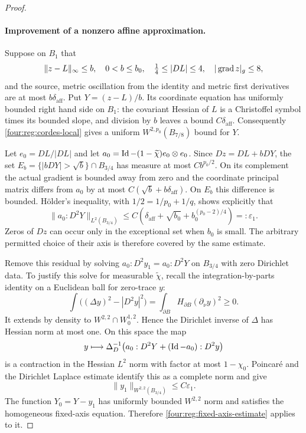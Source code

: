 \begin{proof}
\paragraph{Improvement of a nonzero affine approximation.}
Suppose on $B_1$ that
\begin{equation}\label{four:reg:affine-input}
 \|z-L\|_\infty\le b,\quad 0<b\le b_0,\quad
 \tfrac14\le|DL|\le4,\quad |\operatorname{grad} z|_g\le8,
\end{equation}
and the source, metric oscillation from the identity and metric
first derivatives are at most $b\delta_{\mathrm{aff}}$.  Put $Y=(z-L)/b$.
Its coordinate equation has uniformly bounded right hand side on
$B_1$: the covariant Hessian of $L$ is a Christoffel symbol times
its bounded slope, and division by $b$ leaves a bound $C\delta_{\mathrm{aff}}$.
Consequently \eqref{four:reg:cordes-local} gives a uniform
$W^{2,p_0}(B_{7/8})$ bound for $Y$.

Let $e_0=DL/|DL|$ and let $a_0=\operatorname{Id}-(1-\widetilde\chi)e_0\otimes e_0$.
Since $Dz=DL+bDY$, the set
$E_b=\{|bDY|>\sqrt b\}\cap B_{3/4}$ has measure at most
$Cb^{p_0/2}$.  On its complement the actual gradient is bounded
away from zero and the coordinate principal matrix differs from
$a_0$ by at most $C(\sqrt b+b\delta_{\mathrm{aff}})$.  On $E_b$ this difference
is bounded.  H\"older's inequality, with
$1/2=1/p_0+1/q$, shows explicitly that
\begin{equation}\label{four:reg:small-fixed-source}
 \|a_0:D^2Y\|_{L^2(B_{3/4})}
 \le C\left(\delta_{\mathrm{aff}}+\sqrt{b_0}
                  +b_0^{(p_0-2)/4}\right)=:\varepsilon_1.
\end{equation}
Zeros of $Dz$ can occur only in the exceptional set when $b_0$ is
small.  The arbitrary permitted choice of their axis is therefore
covered by the same estimate.

Remove this residual by solving $a_0:D^2y_1=a_0:D^2Y$ on $B_{3/4}$
with zero Dirichlet data.  To justify this solve for measurable
$\widetilde\chi$, recall the integration-by-parts identity on a
Euclidean ball for zero-trace $y$:
\[
 \int\bigl((\Delta y)^2-|D^2y|^2\bigr)
       =\int_{\partial B}H_{\partial B}(\partial_\nu y)^2\ge0.
\]
It extends by density to $W^{2,2}\cap W^{1,2}_0$.  Hence the
Dirichlet inverse of $\Delta$ has Hessian norm at most one.
On this space the map
\[
 y\longmapsto\Delta_D^{-1}
       \bigl(a_0:D^2Y+(\operatorname{Id}-a_0):D^2y\bigr)
\]
is a contraction in the Hessian $L^2$ norm with factor at most
$1-\chi_0$.  Poincar\'e and the Dirichlet Laplace estimate identify
this as a complete norm and give
\begin{equation}\label{four:reg:small-correction}
 \|y_1\|_{W^{2,2}(B_{3/4})}\le C\varepsilon_1.
\end{equation}
The function $Y_0=Y-y_1$ has uniformly bounded $W^{2,2}$ norm and
satisfies the homogeneous fixed-axis equation.  Therefore
\eqref{four:reg:fixed-axis-estimate} applies to it.


\end{proof}
